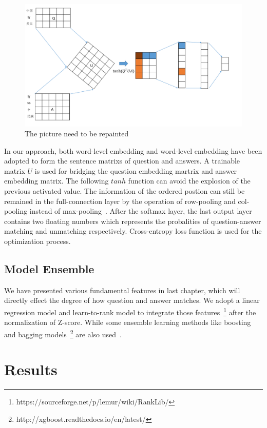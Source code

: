 \documentclass{llncs}
\begin{document}
\begin{figure}
\centering
\includegraphics[width=12cm]{figures/nn.pdf}
\caption{ The picture need to be repainted}
\label{fig:model}
\end{figure}
In our approach, both word-level embedding and word-level embedding have been adopted to form the sentence matrixs of question and answers. A trainable matrix $U$ is used for bridging the question embedding martrix and answer embedding matrix. The following $tanh$ function can avoid the explosion of the previous activated value. The information of the ordered postion can still be remained in the full-connection layer by the operation of row-pooling and col-pooling instead of max-pooling~\cite{Santos2016Attentive}. After the softmax layer, the last output layer contains two floating numbers which represents the probalities of question-answer matching and unmatching respectively. Cross-entropy loss function is used for the optimization process.




\subsection{Model Ensemble}
\label{sec:model}
We have presented various fundamental features in last chapter, which will directly effect the degree of how question and answer matches. We adopt a linear regression model and learn-to-rank model \cite{Liu2009Learning} to integrate those features~\footnote{https://sourceforge.net/p/lemur/wiki/RankLib/} after the normalization of Z-score. While some ensemble learning methods like boosting and bagging models~\footnote{http://xgboost.readthedocs.io/en/latest/} are also used~\cite{Chen2016XGBoost}. 


\section{Results}
\label{sec:results}
\end{document}
